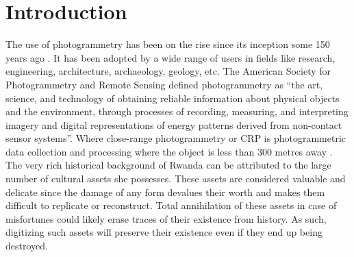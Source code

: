 \documentclass[conference]{IEEEtran}
\begin{document}
\section{\textbf{Introduction}}
The use of photogrammetry has been on the rise since its inception some 150 years ago \cite{histphtgm}. It has been adopted by a wide range of users in fields like research, engineering, architecture, archaeology, geology, etc. The American Society for Photogrammetry and Remote Sensing defined photogrammetry as \cite{Ebert2015} “the art, science, and technology of obtaining reliable information about physical objects and the environment, through processes of recording, measuring, and interpreting imagery and digital representations of energy patterns derived from non-contact sensor systems”. Where close-range photogrammetry or CRP is photogrammetric data collection and processing where the object is less than 300 metres away \cite{crp}. \\

The very rich historical background of Rwanda can be attributed to the large number of cultural assets she possesses. These assets are considered valuable and delicate since the damage of any form devalues their worth and makes them difficult to replicate or reconstruct. Total annihilation of these assets in case of misfortunes could likely erase traces of their existence from history. As such, digitizing such assets will preserve their existence even if they end up being destroyed. \\
\end{document}

